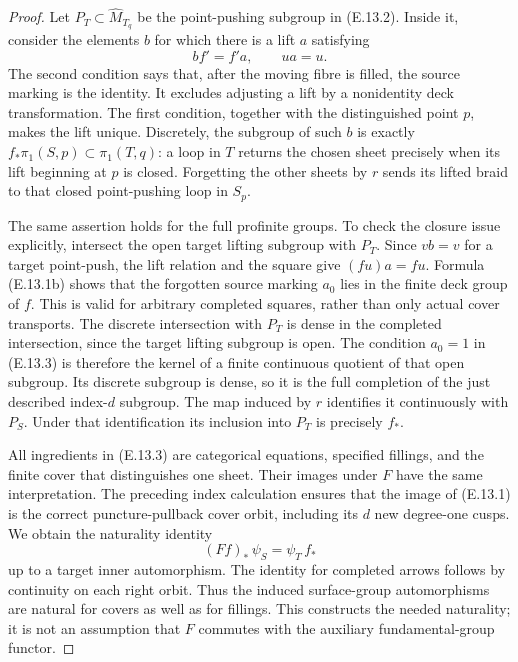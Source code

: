 \begin{proof}
Let $P_T\subset\widehat M_{T_q}$ be the point-pushing subgroup in
(E.13.2). Inside it, consider the elements $b$ for which there is a lift
$a$ satisfying
\[
 b f'=f'a,
 \qquad u a=u.                                               \tag{E.13.3}
\]
The second condition says that, after the moving fibre is filled, the
source marking is the identity. It excludes adjusting a lift by a
nonidentity deck transformation. The first condition, together with the
distinguished point $p$, makes the lift unique. Discretely, the subgroup
of such $b$ is exactly
$f_*\pi_1(S,p)\subset\pi_1(T,q)$: a loop in $T$ returns the chosen
sheet precisely when its lift beginning at $p$ is closed. Forgetting the
other sheets by $r$ sends its lifted braid to that closed point-pushing
loop in $S_p$.

The same assertion holds for the full profinite groups. To check the
closure issue explicitly, intersect the open target lifting subgroup
with $P_T$. Since $v b=v$ for a target point-push, the lift relation
and the square give $(fu)a=fu$. Formula (E.13.1b) shows that the
forgotten source marking $a_0$ lies in the finite deck group of $f$.
This is valid for arbitrary completed squares, rather than only actual
cover transports. The discrete intersection with $P_T$ is dense in
the completed intersection, since the target lifting subgroup is open.
The condition $a_0=1$ in (E.13.3) is therefore the kernel of a finite
continuous quotient of that open subgroup. Its discrete subgroup is
dense, so it is the full completion of the just described index-$d$
subgroup. The map induced by $r$ identifies it continuously with $P_S$.
Under that identification its inclusion into $P_T$ is precisely $f_*$.

All ingredients in (E.13.3) are categorical equations, specified
fillings, and the finite cover that distinguishes one sheet. Their
images under $F$ have the same interpretation. The preceding
index calculation ensures that the image of (E.13.1) is the correct
puncture-pullback cover orbit, including its $d$ new degree-one cusps.
We obtain the naturality identity
\[
 (Ff)_*\,\psi_S=\psi_T\,f_*                                \tag{E.13.4}
\]
up to a target inner automorphism. The identity for completed arrows
follows by continuity on each right orbit. Thus the induced surface-group
automorphisms are natural for covers as well as for fillings. This
constructs the needed naturality; it is not an assumption that $F$
commutes with the auxiliary fundamental-group functor.


\end{proof}
